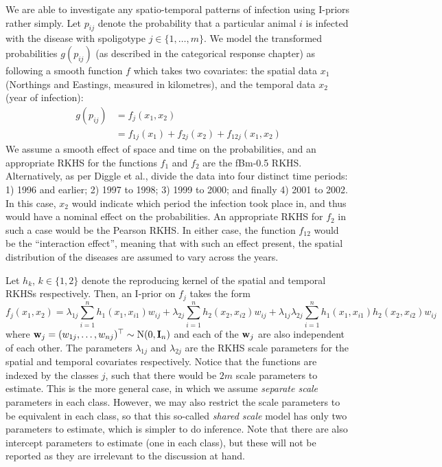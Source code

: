 \documentclass[a4paper,showframe,11pt]{report}\usepackage[]{graphicx}\usepackage[]{color}
\begin{document}
We are able to investigate any spatio-temporal patterns of infection using I-priors rather simply.
Let $p_{ij}$ denote the probability that a particular animal $i$ is infected with the disease with spoligotype $j \in \{1,\dots,m\}$.
We model the transformed probabilities $g(p_{ij})$ (as described in the categorical response chapter) as following a smooth function $f$ which takes two covariates: the spatial data $x_1$ (Northings and Eastings, measured in kilometres), and the temporal data $x_2$ (year of infection):
\begin{align*}
  g(p_{ij}) &= f_j(x_1, x_2) \\
  &= f_{1j}(x_1) + f_{2j}(x_2) + f_{12j}(x_1, x_2)
\end{align*}
We assume a smooth effect of space and time on the probabilities, and an appropriate RKHS for the functions $f_1$ and $f_2$ are the fBm-0.5 RKHS. Alternatively, as per Diggle et al., divide the data into four distinct time periods: 1) 1996 and earlier; 2) 1997 to 1998; 3) 1999 to 2000; and finally 4) 2001 to 2002. In this case, $x_2$ would indicate which period the infection took place in, and thus would have a nominal effect on the probabilities. An appropriate RKHS for $f_2$ in such a case would be the Pearson RKHS. In either case, the function $f_{12}$ would be the ``interaction effect'', meaning that with such an effect present, the spatial distribution of the diseases are assumed to vary across the years.

Let $h_k$, $k \in \{1,2\}$ denote the reproducing kernel of the spatial and temporal RKHSs respectively.
Then, an I-prior on $f_j$ takes the form
\[
  f_j(x_1, x_2) = \lambda_{1j} \sum_{i=1}^n h_1(x_1, x_{i1}) w_{ij} +
  \lambda_{2j} \sum_{i=1}^n h_2(x_2, x_{i2}) w_{ij} +
   \lambda_{1j} \lambda_{2j} \sum_{i=1}^n  h_1(x_1, x_{i1})h_2(x_2, x_{i2}) w_{ij}
\]
where ${\mathbf w}_j = (w_{1j}, \dots, w_{nj})^\top \sim \operatorname{N}(0,{\mathbf I}_n)$ and each of the ${\mathbf w}_j$ are also independent of each other.
The parameters $\lambda_{1j}$ and $\lambda_{2j}$ are the RKHS scale parameters for the spatial and temporal covariates respectively.
Notice that the functions are indexed by the classes $j$, such that there would be $2m$ scale parameters to estimate.
This is the more general case, in which we assume \emph{separate scale} parameters in each class.
However, we may also restrict the scale parameters to be equivalent in each class, so that this so-called \emph{shared scale} model has only two parameters to estimate, which is simpler to do inference.
Note that there are also intercept parameters to estimate (one in each class), but these will not be reported as they are irrelevant to the discussion at hand.
\end{document}
